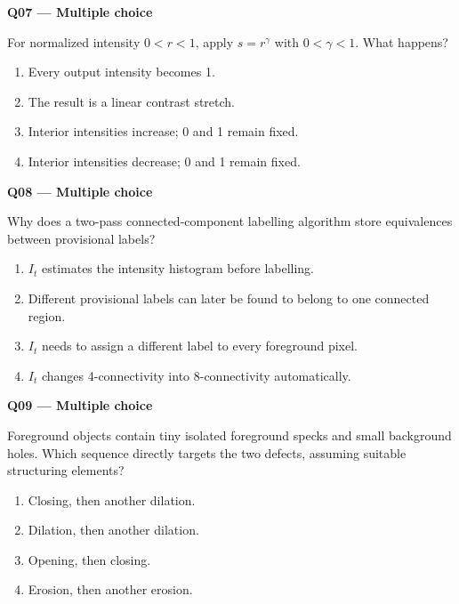 \documentclass[11pt,a4paper]{article}
\begin{document}
\par\vspace{12pt}
\begin{minipage}{\linewidth}
\textbf{Q07 — Multiple choice}\par\smallskip
For normalized intensity \(0<r<1\),\allowbreak{} apply \(s=r^{\gamma}\) with \(0<\gamma<1\). What happens?
\begin{enumerate}[label=\textbf{\Alph*.}]
\item Every output intensity becomes 1.
\item The result is a linear contrast stretch.
\item Interior intensities increase; 0 and 1 remain fixed.
\item Interior intensities decrease; 0 and 1 remain fixed.
\end{enumerate}
\end{minipage}
\par\vspace{12pt}
\begin{minipage}{\linewidth}
\textbf{Q08 — Multiple choice}\par\smallskip
Why does a two-pass connected-component labelling algorithm store equivalences between provisional labels?
\begin{enumerate}[label=\textbf{\Alph*.}]
\item \(I_t\) estimates the intensity histogram before labelling.
\item Different provisional labels can later be found to belong to one connected region.
\item \(I_t\) needs to assign a different label to every foreground pixel.
\item \(I_t\) changes 4-connectivity into 8-connectivity automatically.
\end{enumerate}
\end{minipage}
\par\vspace{12pt}
\begin{minipage}{\linewidth}
\textbf{Q09 — Multiple choice}\par\smallskip
Foreground objects contain tiny isolated foreground specks and small background holes. Which sequence directly targets the two defects,\allowbreak{} assuming suitable structuring elements?
\begin{enumerate}[label=\textbf{\Alph*.}]
\item Closing,\allowbreak{} then another dilation.
\item Dilation,\allowbreak{} then another dilation.
\item Opening,\allowbreak{} then closing.
\item Erosion,\allowbreak{} then another erosion.
\end{enumerate}
\end{minipage}
\end{document}
